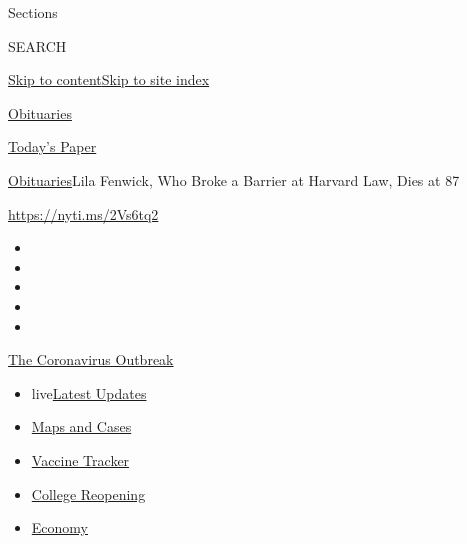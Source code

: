 Sections

SEARCH

\protect\hyperlink{site-content}{Skip to
content}\protect\hyperlink{site-index}{Skip to site index}

\href{https://www.nytimes.com/section/obituaries}{Obituaries}

\href{https://myaccount.nytimes.com/auth/login?response_type=cookie\&client_id=vi}{}

\href{https://www.nytimes.com/section/todayspaper}{Today's Paper}

\href{/section/obituaries}{Obituaries}\textbar{}Lila Fenwick, Who Broke
a Barrier at Harvard Law, Dies at 87

\url{https://nyti.ms/2Vs6tq2}

\begin{itemize}
\item
\item
\item
\item
\item
\end{itemize}

\href{https://www.nytimes.com/news-event/coronavirus?action=click\&pgtype=Article\&state=default\&region=TOP_BANNER\&context=storylines_menu}{The
Coronavirus Outbreak}

\begin{itemize}
\tightlist
\item
  live\href{https://www.nytimes.com/2020/08/03/world/coronavirus-covid-19.html?action=click\&pgtype=Article\&state=default\&region=TOP_BANNER\&context=storylines_menu}{Latest
  Updates}
\item
  \href{https://www.nytimes.com/interactive/2020/us/coronavirus-us-cases.html?action=click\&pgtype=Article\&state=default\&region=TOP_BANNER\&context=storylines_menu}{Maps
  and Cases}
\item
  \href{https://www.nytimes.com/interactive/2020/science/coronavirus-vaccine-tracker.html?action=click\&pgtype=Article\&state=default\&region=TOP_BANNER\&context=storylines_menu}{Vaccine
  Tracker}
\item
  \href{https://www.nytimes.com/2020/08/02/us/covid-college-reopening.html?action=click\&pgtype=Article\&state=default\&region=TOP_BANNER\&context=storylines_menu}{College
  Reopening}
\item
  \href{https://www.nytimes.com/live/2020/08/03/business/stock-market-today-coronavirus?action=click\&pgtype=Article\&state=default\&region=TOP_BANNER\&context=storylines_menu}{Economy}
\end{itemize}

